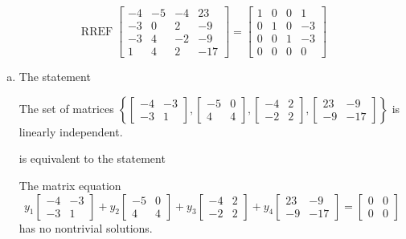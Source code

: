 \begin{exerciseAnswer} 


\[\operatorname{RREF} \left[\begin{array}{cccc}
-4 & -5 & -4 & 23 \\
-3 & 0 & 2 & -9 \\
-3 & 4 & -2 & -9 \\
1 & 4 & 2 & -17
\end{array}\right] = \left[\begin{array}{cccc}
1 & 0 & 0 & 1 \\
0 & 1 & 0 & -3 \\
0 & 0 & 1 & -3 \\
0 & 0 & 0 & 0
\end{array}\right] \]


\begin{enumerate}[(a)]
\item The statement 
\begin{center}\begin{minipage}{0.8\textwidth}
 The set of matrices \( \left\{ \left[\begin{array}{cc}
-4 & -3 \\
-3 & 1
\end{array}\right] , \left[\begin{array}{cc}
-5 & 0 \\
4 & 4
\end{array}\right] , \left[\begin{array}{cc}
-4 & 2 \\
-2 & 2
\end{array}\right] , \left[\begin{array}{cc}
23 & -9 \\
-9 & -17
\end{array}\right] \right\} \) is linearly independent.
\end{minipage}\end{center}
     is equivalent to the statement 
\begin{center}\begin{minipage}{0.8\textwidth}
 The matrix equation \[ y_{1} \left[\begin{array}{cc}
-4 & -3 \\
-3 & 1
\end{array}\right] + y_{2} \left[\begin{array}{cc}
-5 & 0 \\
4 & 4
\end{array}\right] + y_{3} \left[\begin{array}{cc}
-4 & 2 \\
-2 & 2
\end{array}\right] + y_{4} \left[\begin{array}{cc}
23 & -9 \\
-9 & -17
\end{array}\right] = \left[\begin{array}{cc}
0 & 0 \\
0 & 0
\end{array}\right] \] has no nontrivial solutions. 
\end{minipage}\end{center}
    

\end{enumerate}
\end{exerciseAnswer}
